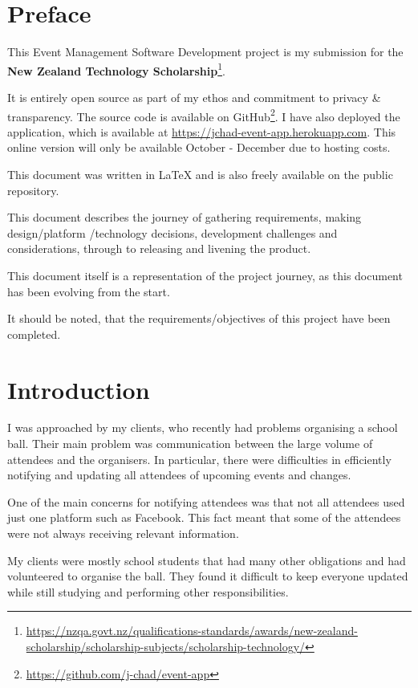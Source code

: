 \documentclass[a4paper,oneside,12pt]{report}
\begin{document}
	\tableofcontents
	\pagebreak

	\chapter{Preface}
	This Event Management Software Development project is my submission for the \textbf{New Zealand Technology Scholarship}\footnote{\url{https://nzqa.govt.nz/qualifications-standards/awards/new-zealand-scholarship/scholarship-subjects/scholarship-technology/}}.

	It is entirely open source as part of my ethos and commitment to privacy \& transparency. The source code is available on GitHub\footnote{\url{https://github.com/j-chad/event-app}}.  I have also deployed the application, which is available at \url{https://jchad-event-app.herokuapp.com}. This online version will only be available October - December due to hosting costs.

	This document was written in \LaTeX{} and is also freely available on the public repository.
	
	This document describes the journey of gathering requirements, making design/platform /technology decisions, development challenges and considerations, through to releasing and livening the product.
	
	This document itself is a representation of the project journey, as this document has been evolving from the start.
	
	It should be noted, that the requirements/objectives of this project have been completed.

	\chapter{Introduction}
	I was approached by my clients, who recently had problems organising a school ball. Their main problem was communication between the large volume of attendees and the organisers. In particular, there were difficulties in efficiently notifying and updating all attendees of upcoming events and changes.

    One of the main concerns for notifying attendees was that not all attendees used just one platform such as Facebook. This fact meant that some of the attendees were not always receiving relevant information.

    My clients were mostly school students that had many other obligations and had volunteered to organise the ball. They found it difficult to keep everyone updated while still studying and performing other responsibilities.
\end{document}
